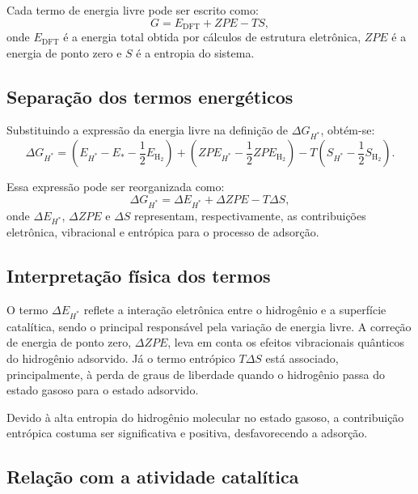Cada termo de energia livre pode ser escrito como:
\begin{equation}
G = E_{\text{DFT}} + ZPE - TS,
\end{equation}
onde \( E_{\text{DFT}} \) é a energia total obtida por cálculos de estrutura eletrônica, \( ZPE \) é a energia de ponto zero e \( S \) é a entropia do sistema.

\subsection{Separação dos termos energéticos}

Substituindo a expressão da energia livre na definição de \( \Delta G_{H^*} \), obtém-se:
\begin{equation}
\Delta G_{H^*} =
\left( E_{H^*} - E_* - \frac{1}{2}E_{\mathrm{H_2}} \right)
+ \left( ZPE_{H^*} - \frac{1}{2}ZPE_{\mathrm{H_2}} \right)
- T\left( S_{H^*} - \frac{1}{2}S_{\mathrm{H_2}} \right).
\end{equation}

Essa expressão pode ser reorganizada como:
\begin{equation}
\Delta G_{H^*} = \Delta E_{H^*} + \Delta ZPE - T\Delta S,
\end{equation}
onde \( \Delta E_{H^*} \), \( \Delta ZPE \) e \( \Delta S \) representam, respectivamente, as contribuições eletrônica, vibracional e entrópica para o processo de adsorção.

\subsection{Interpretação física dos termos}

O termo \( \Delta E_{H^*} \) reflete a interação eletrônica entre o hidrogênio e a superfície catalítica, sendo o principal responsável pela variação de energia livre. A correção de energia de ponto zero, \( \Delta ZPE \), leva em conta os efeitos vibracionais quânticos do hidrogênio adsorvido. Já o termo entrópico \( T\Delta S \) está associado, principalmente, à perda de graus de liberdade quando o hidrogênio passa do estado gasoso para o estado adsorvido.

Devido à alta entropia do hidrogênio molecular no estado gasoso, a contribuição entrópica costuma ser significativa e positiva, desfavorecendo a adsorção.

\subsection{Relação com a atividade catalítica}

